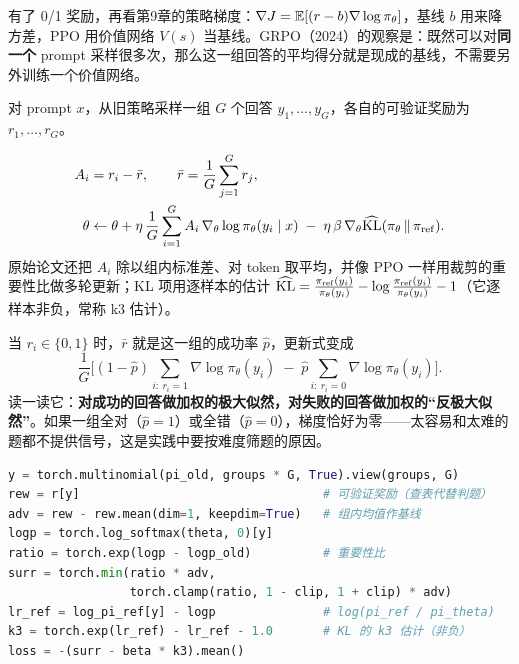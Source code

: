 有了 0/1 奖励，再看第9章的策略梯度：$\nabla J = \mathbb{E}[(r - b)\nabla\log\pi_\theta]$，基线 $b$ 用来降方差，PPO 用价值网络 $V(s)$ 当基线。GRPO（2024）的观察是：既然可以对\textbf{同一个} prompt 采样很多次，那么这一组回答的平均得分就是现成的基线，不需要另外训练一个价值网络。

对 prompt $x$，从旧策略采样一组 $G$ 个回答 $y_1, \ldots, y_G$，各自的可验证奖励为 $r_1, \ldots, r_G$。

\begin{keyformula}[title=GRPO 的简化更新式]
\begin{equation}
    \begin{aligned}
    A_i &= r_i - \bar r, \qquad \bar r = \frac{1}{G}\sum_{j=1}^G r_j, \\
    \theta &\leftarrow \theta + \eta\,\frac{1}{G}\sum_{i=1}^G A_i\,\nabla_\theta\log\pi_\theta(y_i \mid x) \;-\; \eta\,\beta\,\nabla_\theta\widehat{\mathrm{KL}}(\pi_\theta\,\|\,\pi_{\rm ref}).
    \end{aligned}
    \label{eq:grpo}
\end{equation}
原始论文还把 $A_i$ 除以组内标准差、对 token 取平均，并像 PPO 一样用裁剪的重要性比做多轮更新；KL 项用逐样本的估计 $\widehat{\mathrm{KL}} = \frac{\pi_{\rm ref}(y_i)}{\pi_\theta(y_i)} - \log\frac{\pi_{\rm ref}(y_i)}{\pi_\theta(y_i)} - 1$（它逐样本非负，常称 k3 估计）。
\end{keyformula}

当 $r_i \in \{0, 1\}$ 时，$\bar r$ 就是这一组的成功率 $\hat p$，更新式变成
\begin{equation}
    \frac{1}{G}\Big[(1 - \hat p)\sum_{i:\ r_i = 1}\nabla\log\pi_\theta(y_i) \;-\; \hat p\sum_{i:\ r_i = 0}\nabla\log\pi_\theta(y_i)\Big].
\end{equation}
读一读它：\textbf{对成功的回答做加权的极大似然，对失败的回答做加权的“反极大似然”}。如果一组全对（$\hat p = 1$）或全错（$\hat p = 0$），梯度恰好为零——太容易和太难的题都不提供信号，这是实践中要按难度筛题的原因。

\begin{lstlisting}[language=Python, caption={GRPO 一步更新的核心（本章实验一的玩具版，单个 prompt、$K$ 个离散回答）}]
y = torch.multinomial(pi_old, groups * G, True).view(groups, G)
rew = r[y]                                  # 可验证奖励（查表代替判题）
adv = rew - rew.mean(dim=1, keepdim=True)   # 组内均值作基线
logp = torch.log_softmax(theta, 0)[y]
ratio = torch.exp(logp - logp_old)          # 重要性比
surr = torch.min(ratio * adv,
                 torch.clamp(ratio, 1 - clip, 1 + clip) * adv)
lr_ref = log_pi_ref[y] - logp               # log(pi_ref / pi_theta)
k3 = torch.exp(lr_ref) - lr_ref - 1.0       # KL 的 k3 估计（非负）
loss = -(surr - beta * k3).mean()
\end{lstlisting}

